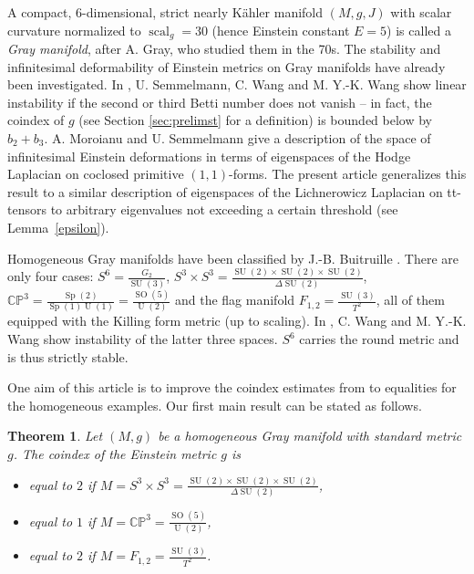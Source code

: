 \documentclass[12pt]{scrartcl}
\theoremstyle{plain}
\newtheorem{satz}{Theorem}[section]
\theoremstyle{definition}
\newcommand{\CP}{\mathbb{CP}}%
\newcommand{\scal}{\operatorname{scal}}%
\newcommand{\U}{\operatorname{U}}%
\newcommand{\SU}{\operatorname{SU}}%
\newcommand{\SO}{\operatorname{SO}}%
\newcommand{\Sp}{\operatorname{Sp}}%
\newcommand{\Einstein}{E}%
\begin{document}
A compact, $6$-dimensional, strict nearly Kähler manifold $(M,g,J)$ with scalar curvature normalized to $\scal_g=30$ (hence Einstein constant $\Einstein=5$) is called a \emph{Gray manifold}, after A. Gray, who studied them in the 70s. The stability and infinitesimal deformability of Einstein metrics on Gray manifolds have already been investigated. In \cite{nkstability}, U. Semmelmann, C. Wang and M. Y.-K. Wang show linear instability if the second or third Betti number does not vanish -- in fact, the coindex of $g$ (see Section \ref{sec:prelimst} for a definition) is bounded below by $b_2+b_3$. A. Moroianu and U. Semmelmann \cite{nearlykaehler} give a description of the space of infinitesimal Einstein deformations in terms of eigenspaces of the Hodge Laplacian on coclosed primitive $(1,1)$-forms. The present article generalizes this result to a similar description of eigenspaces of the Lichnerowicz Laplacian on tt-tensors to arbitrary eigenvalues not exceeding a certain threshold (see Lemma~\ref{epsilon}).

Homogeneous Gray manifolds have been classified by J.-B. Buitruille \cite{butruilleclass}. There are only four cases: $S^6=\frac{G_2}{\SU(3)}$, $S^3\times S^3=\frac{\SU(2)\times\SU(2)\times\SU(2)}{\Delta\SU(2)}$, $\CP^3=\frac{\Sp(2)}{\Sp(1)\U(1)}=\frac{\SO(5)}{\U(2)}$ and the flag manifold $F_{1,2}=\frac{\SU(3)}{T^2}$, all of them equipped with the Killing form metric (up to scaling). In \cite{WW}, C. Wang and M. Y.-K. Wang show instability of the latter three spaces. $S^6$ carries the round metric and is thus strictly stable.

One aim of this article is to improve the coindex estimates from \cite{nkstability} to equalities for the homogeneous examples. Our first main result can be stated as follows.

\begin{satz}\label{thm1}
Let $(M,g)$ be a homogeneous Gray manifold with standard metric $g$. The coindex of the Einstein metric $g$ is
\begin{itemize}
 \item equal to $2$ if $M=S^3\times S^3=\frac{\SU(2)\times\SU(2)\times\SU(2)}{\Delta\SU(2)}$,
 \item equal to $1$ if $M=\CP^3=\frac{\SO(5)}{\U(2)}$,
 \item equal to $2$ if $M=F_{1,2}=\frac{\SU(3)}{T^2}$.
\end{itemize}
\end{satz}
\end{document}
